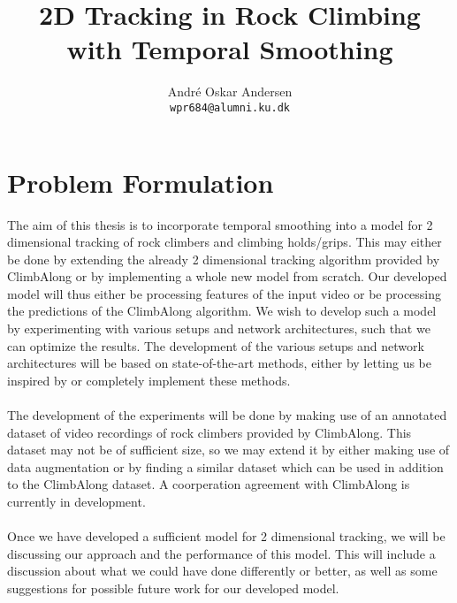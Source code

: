\documentclass[11pt]{article}
\title{2D Tracking in Rock Climbing with Temporal Smoothing}
\author{André Oskar Andersen \\
  \texttt{wpr684@alumni.ku.dk} \\}
\date{}
\begin{document}
\maketitle

\section*{Problem Formulation}
The aim of this thesis is to incorporate temporal smoothing into a model for 2 dimensional tracking of rock climbers and climbing holds/grips. This may either be done by extending the already 2 dimensional tracking algorithm provided by ClimbAlong or by implementing a whole new model from scratch. Our developed model will thus either be processing features of the input video or be processing the predictions of the ClimbAlong algorithm. We wish to develop such a model by experimenting with various setups and network architectures, such that we can optimize the results. The development of the various setups and network architectures will be based on state-of-the-art methods, either by letting us be inspired by or completely implement these methods.
\\
\\
The development of the experiments will be done by making use of an annotated dataset of video recordings of rock climbers provided by ClimbAlong. This dataset may not be of sufficient size, so we may extend it by either making use of data augmentation or by finding a similar dataset which can be used in addition to the ClimbAlong dataset. A coorperation agreement with ClimbAlong is currently in development. 
\\
\\
Once we have developed a sufficient model for 2 dimensional tracking, we will be discussing our approach and the performance of this model. This will include a discussion about what we could have done differently or better, as well as some suggestions for possible future work for our developed model. 

%
\end{document}
